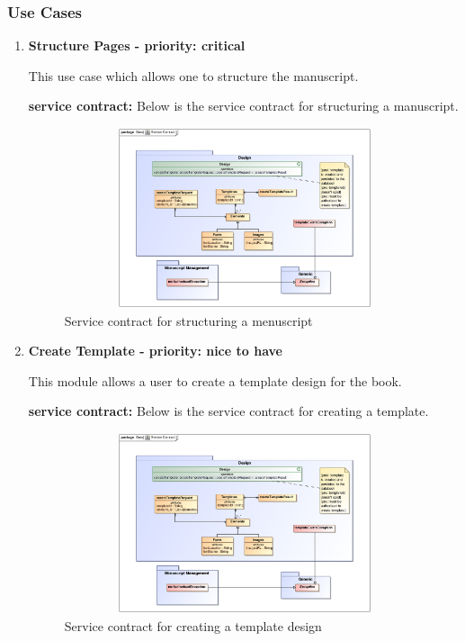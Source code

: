 \subsubsection{Use Cases}
\begin{enumerate}
\item \textbf{Structure Pages - priority: critical}
\par{This use case which allows one to structure the  manuscript.}
\par{\textbf{service contract:} Below is the service contract for structuring a manuscript.
}
\begin{figure}[h]
\includegraphics[height=200px, width=500px]{epsImages/Design/createTemplateServiceContract.eps}
\caption{Service contract for structuring a menuscript}
\end{figure}

\item \textbf{Create Template - priority: nice to have}
\par{This module allows a user to create a template design for the book.}
\par{\textbf{service contract:} Below is the service contract for creating a template.
}
 \begin{figure}[h]
\includegraphics[height=200px, width=500px]{epsImages/Design/createTemplateServiceContract.eps}
\caption{Service contract for creating a template design}
\end{figure}


\end{enumerate}
